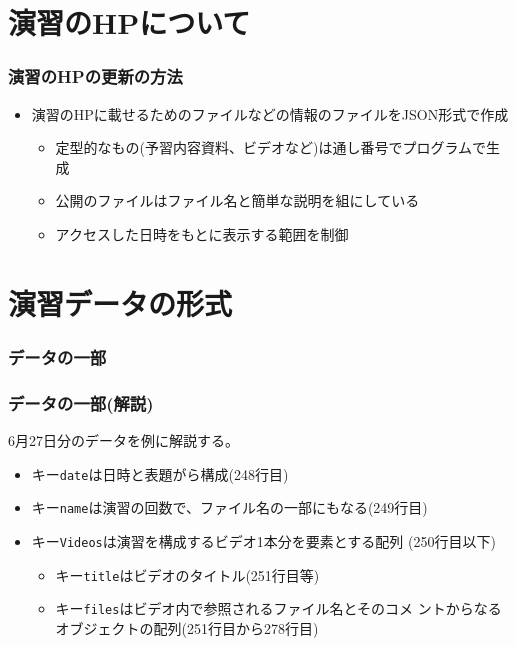 

\frame{\maketitle}
\section{演習のHPについて}
\begin{frame}[containsverbatim]
 \frametitle{演習のHPの更新の方法}
\begin{itemize}
 \item 演習のHPに載せるためのファイルなどの情報のファイルをJSON形式で作成
\begin{itemize}
 \item 定型的なもの(予習内容資料、ビデオなど)は通し番号でプログラムで生
       成
 \item 公開のファイルはファイル名と簡単な説明を組にしている
 \item アクセスした日時をもとに表示する範囲を制御
\end{itemize}
\end{itemize}
\end{frame}
\section{演習データの形式}
\begin{frame}[containsverbatim]
 \frametitle{データの一部}
\end{frame}
\begin{frame}[containsverbatim]
 \frametitle{データの一部(解説)}
 6月27日分のデータを例に解説する。
\begin{itemize}
 \item キー\texttt{date}は日時と表題がら構成(248行目)
 \item キー\texttt{name}は演習の回数で、ファイル名の一部にもなる(249行目)
 \item キー\texttt{Videos}は演習を構成するビデオ1本分を要素とする配列
       (250行目以下)
       \begin{itemize}
        \item キー\texttt{title}はビデオのタイトル(251行目等)
        \item キー\texttt{files}はビデオ内で参照されるファイル名とそのコメ
              ントからなるオブジェクトの配列(251行目から278行目)
       \end{itemize}
\end{itemize}
\end{frame}

